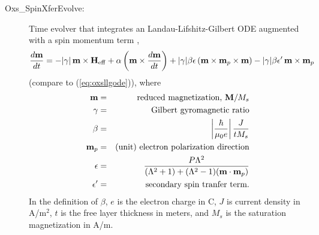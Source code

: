 \begin{description}
\item[Oxs\_SpinXferEvolve:\label{HTMLSpinXferEvolve}]
%
Time evolver that integrates an
Landau-Lifshitz-Gilbert ODE augmented with a
spin momentum term \cite{xiao2004},
\begin{equation}
\htmlimage{antialias}
  \frac{d\vm}{dt} = -|\gamma|\,\vm\times\vH_{\rm eff}
   + \alpha
     \left(\vm\times\frac{d\vm}{dt}\right)
   + |\gamma|\beta\epsilon
     \left(\vm\times\vm_p\times\vm\right)
   - |\gamma|\beta\epsilon^\prime\,\vm\times\vm_p
\label{eq:oxsllgspinxfer}
\end{equation}
(compare to (\ref{eq:oxsllgode})), where
\begin{eqnarray*}
\textbf{m} & = & \mbox{reduced magnetization, $\textbf{M}/M_s$} \\
\gamma & = & \mbox{Gilbert gyromagnetic ratio} \\
\beta & = & \left|\frac{\hbar}{\mu_0 e}\right|\frac{J}{t M_s} \\
\textbf{m}_p & = & \mbox{(unit) electron polarization direction} \\
\epsilon & = &
\frac{P\Lambda^2}{(\Lambda^2+1)+(\Lambda^2-1)(\textbf{m}\cdot\textbf{m}_p)} \\
\epsilon^\prime & = & \mbox{secondary spin tranfer term}.
\end{eqnarray*}
In the definition of $\beta$, $e$ is the electron charge in C, $J$ is
current density in A/m${}^2$, $t$ is the free layer thickness in meters,
and $M_s$ is the saturation magnetization in A/m.


\end{description}
